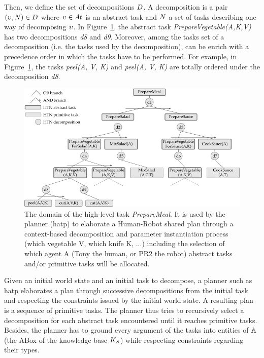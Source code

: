 Then, we define the set of decompositions $D$. A decomposition is a pair $(\upsilon, N) \in D$ where $\upsilon \in At$ is an abstract task and $N$ a set of tasks describing one way of decomposing $\upsilon$. In Figure~\ref{fig:chap6_domain}, the abstract task \textit{PrepareVegetable(A,K,V)} has two decompositions \textit{d8} and \textit{d9}. Moreover, among the tasks set of a decomposition (i.e. the tasks used by the decomposition), can be enrich with a precedence order in which the tasks have to be performed. For example, in Figure~\ref{fig:chap6_domain}, the tasks \textit{peel(A, V, K)} and \textit{peel(A, V, K)} are totally ordered under the decomposition \textit{d8}. 

\begin{figure}[h!]
\centering
\includegraphics[width=\textwidth]{figures/chapter6/domain.png}
\caption{\label{fig:chap6_domain} The  domain of the high-level task \textit{PrepareMeal}. It is used by the planner (\acrshort{hatp}) to elaborate a Human-Robot shared plan through a context-based decomposition and parameter instantiation process (which vegetable V, which knife K, ...) including the selection of which agent A (Tony the human, or PR2 the robot) abstract tasks and/or primitive tasks will be allocated.}
\end{figure}

Given an initial world state and an initial task to decompose, a planner such as \acrshort{hatp} elaborates a plan through successive decompositions from the initial task and respecting the constraints issued by the initial world state. A resulting plan is a sequence of primitive tasks. The planner thus tries to recursively select a decomposition for each abstract task encountered until it reaches primitive tasks. Besides, the planner has to ground every argument of the tasks into entities of $\mathbb{A}$ (the ABox of the knowledge base $K_S$) while respecting constraints regarding their types.

